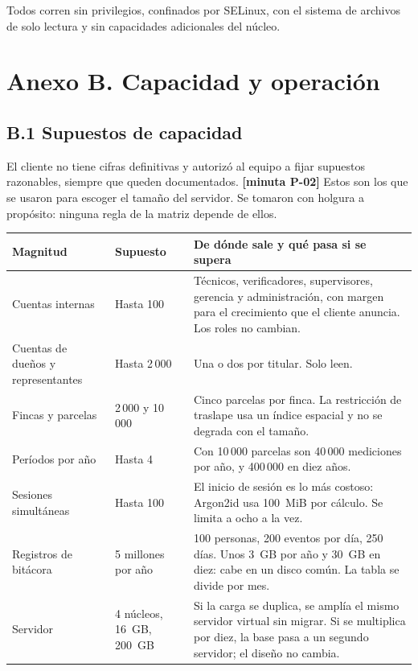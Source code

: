 \documentclass[11pt,letterpaper]{article}
\newcommand{\cab}[1]{\textbf{\rmfamily #1}}
\newcommand{\resp}[1]{\textrm{\footnotesize\bfseries [minuta #1]}}
\begin{document}
Todos corren sin privilegios, confinados por SELinux, con el sistema de archivos de solo lectura y sin
capacidades adicionales del núcleo.

\Needspace{9cm}
\section*{Anexo B. Capacidad y operación}
\label{anexo:capacidad}

\subsection*{B.1 Supuestos de capacidad}

El cliente no tiene cifras definitivas y autorizó al equipo a fijar supuestos razonables, siempre que
queden documentados. \resp{P-02} Estos son los que se usaron para escoger el tamaño del servidor. Se
tomaron con holgura a propósito: ninguna regla de la matriz depende de ellos.

\begin{center}
\small
\renewcommand{\arraystretch}{1.22}
\begin{tabularx}{\textwidth}{@{}L{4.3cm} L{2.6cm} Y@{}}
\toprule
\cab{Magnitud} & \cab{Supuesto} & \cab{De dónde sale y qué pasa si se supera} \\
\midrule
Cuentas internas & Hasta 100 & Técnicos, verificadores, supervisores, gerencia y administración, con margen para el crecimiento que el cliente anuncia. Los roles no cambian. \\
Cuentas de dueños y representantes & Hasta 2\,000 & Una o dos por titular. Solo leen. \\
Fincas y parcelas & 2\,000 y 10\,000 & Cinco parcelas por finca. La restricción de traslape usa un índice espacial y no se degrada con el tamaño. \\
Períodos por año & Hasta 4 & Con 10\,000 parcelas son 40\,000 mediciones por año, y 400\,000 en diez años. \\
Sesiones simultáneas & Hasta 100 & El inicio de sesión es lo más costoso: Argon2id usa 100~MiB por cálculo. Se limita a ocho a la vez. \\
Registros de bitácora & 5 millones por año & 100 personas, 200 eventos por día, 250 días. Unos 3~GB por año y 30~GB en diez: cabe en un disco común. La tabla se divide por mes. \\
Servidor & 4 núcleos, 16~GB, 200~GB & Si la carga se duplica, se amplía el mismo servidor virtual sin migrar. Si se multiplica por diez, la base pasa a un segundo servidor; el diseño no cambia. \\
\bottomrule
\end{tabularx}
\end{center}
\end{document}
